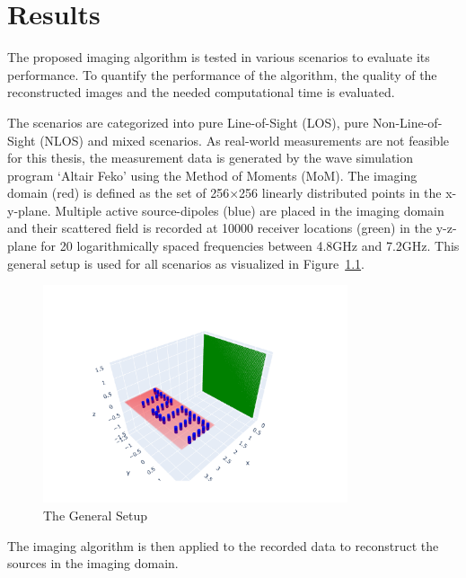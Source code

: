
\chapter{Results}\label{chapter:results}
The proposed imaging algorithm is tested in various scenarios to evaluate its performance.
To quantify the performance of the algorithm, the quality of the reconstructed images and the needed computational time is evaluated.


The scenarios are categorized into pure Line-of-Sight (LOS), pure Non-Line-of-Sight (NLOS) and mixed scenarios.
As real-world measurements are not feasible for this thesis, the measurement data is generated by the wave simulation program `Altair Feko' using the Method of Moments (MoM).
The imaging domain (red) is defined as the set of 256\(\times \)256 linearly distributed points in the x-y-plane.
Multiple active source-dipoles (blue) are placed in the imaging domain and their scattered field is recorded at 10000 receiver locations (green) in the y-z-plane for 20 logarithmically spaced frequencies between 4.8GHz and 7.2GHz.
This general setup is used for all scenarios as visualized in Figure~\ref{fig:general_setup}.

\begin{figure}[ht]
    \centering
    \includegraphics[width=0.8\textwidth]{figures/general_setup.pdf}
    \caption{The General Setup}\label{fig:general_setup}
\end{figure}


The imaging algorithm is then applied to the recorded data to reconstruct the sources in the imaging domain.


